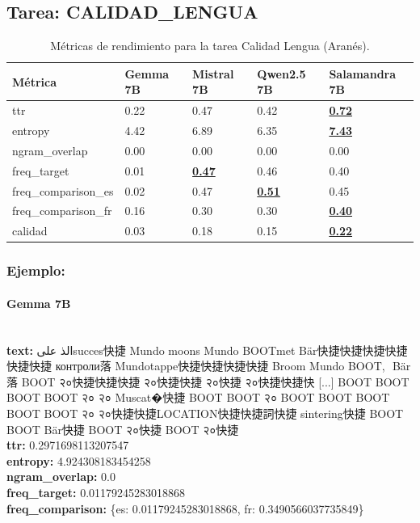 \subsection{Tarea: CALIDAD\_LENGUA}\label{tarea-calidad_lengua}
\begin{longtable}[]{@{}lllll@{}}
\toprule\noalign{}
Métrica & Gemma 7B & Mistral 7B & Qwen2.5 7B & Salamandra 7B \\
\midrule\noalign{}
\endhead
\bottomrule\noalign{}
\caption{Métricas de rendimiento para la tarea Calidad Lengua (Aranés).}
\label{tab:metricas_calidad_lengua_Aranés}
\endlastfoot
ttr & 0.22 & 0.47 & 0.42 & \textbf{\underline{0.72}} \\
entropy & 4.42 & 6.89 & 6.35 & \textbf{\underline{7.43}} \\
ngram\_overlap & 0.00 & 0.00 & 0.00 & 0.00 \\
freq\_target & 0.01 & \textbf{\underline{0.47}} & 0.46 & 0.40 \\
freq\_comparison\_es & 0.02 & 0.47 & \textbf{\underline{0.51}} & 0.45 \\
freq\_comparison\_fr & 0.16 & 0.30 & 0.30 & \textbf{\underline{0.40}} \\
calidad & 0.03 & 0.18 & 0.15 & \textbf{\underline{0.22}} \\
\end{longtable}

\subsubsection{Ejemplo:}

\paragraph{Gemma 7B}~\\
\textbf{text:} الذ علىsucces快捷 Mundo moons Mundo BOOTmet Bär快捷快捷快捷快捷快捷快捷 контроли落 Mundotappe快捷快捷快捷快捷 Broom Mundo BOOT,\,\ Bär落 BOOT २०快捷快捷快捷 २०快捷快捷 २०快捷 २०快捷快捷快 [...] BOOT BOOT BOOT BOOT २० २० Muscat�快捷 BOOT BOOT २० BOOT BOOT BOOT BOOT BOOT २० २०快捷快捷LOCATION快捷快捷詞快捷 sintering快捷 BOOT BOOT Bär快捷 BOOT २०快捷 BOOT २०快捷\\
\textbf{ttr:} 0.2971698113207547\\
\textbf{entropy:} 4.924308183454258\\
\textbf{ngram\_overlap:} 0.0\\
\textbf{freq\_target:} 0.01179245283018868\\
\textbf{freq\_comparison:} \{\textquotesingle{}es\textquotesingle{}: 0.01179245283018868, \textquotesingle{}fr\textquotesingle{}: 0.3490566037735849\}

